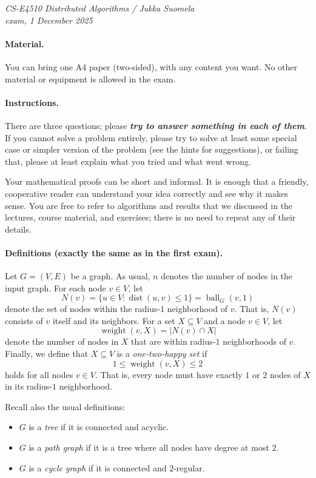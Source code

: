 \documentclass[12pt,a4paper]{article}
\newcommand{\cemph}[1]{\textbf{\emph{\boldmath #1}}}
\DeclareMathOperator{\dist}{dist}
\DeclareMathOperator{\ball}{ball}
\DeclareMathOperator{\weight}{weight}
\begin{document}
\noindent
\emph{CS-E4510 Distributed Algorithms / Jukka Suomela\\
exam, 1 December 2025}

\paragraph{Material.}

You can bring one A4 paper (two-sided), with any content you want. No other material or equipment is allowed in the exam.

\paragraph{Instructions.}

There are three questions; please \cemph{try to answer something in each of them}. If you cannot solve a problem entirely, please try to solve at least some special case or simpler version of the problem (see the hints for suggestions), or failing that, please at least explain what you tried and what went wrong.

Your mathematical proofs can be short and informal. It is enough that a friendly, cooperative reader can understand your idea correctly and see why it makes sense. You are free to refer to algorithms and results that we discussed in the lectures, course material, and exercises; there is no need to repeat any of their details.

\paragraph{Definitions (exactly the same as in the first exam).}

Let $G=(V,E)$ be a graph. As usual, $n$ denotes the number of nodes in the input graph. For each node $v \in V$, let
\[
    N(v) = \{ u \in V : \dist(u,v) \le 1 \} = \ball_G(v, 1)
\]
denote the set of nodes within the radius-$1$ neighborhood of $v$. That is, $N(v)$ consists of $v$ itself and its neighbors. For a set $X \subseteq V$ and a node $v \in V$, let
\[
    \weight(v,X) = \left| N(v) \cap X \right|
\]
denote the number of nodes in $X$ that are within radius-$1$ neighborhoods of $v$. Finally, we define that $X \subseteq V$ is a \emph{one-two-happy set} if
\[
1 \le \weight(v,X) \le 2
\]
holds for all nodes $v \in V$. That is, every node must have exactly $1$ or $2$ nodes of $X$ in its radius-$1$ neighborhood.

Recall also the usual definitions:
\begin{itemize}
    \item $G$ is a \emph{tree} if it is connected and acyclic.
    \item $G$ is a \emph{path graph} if it is a tree where all nodes have degree at most $2$.
    \item $G$ is a \emph{cycle graph} if it is connected and $2$-regular.
\end{itemize}
\end{document}
